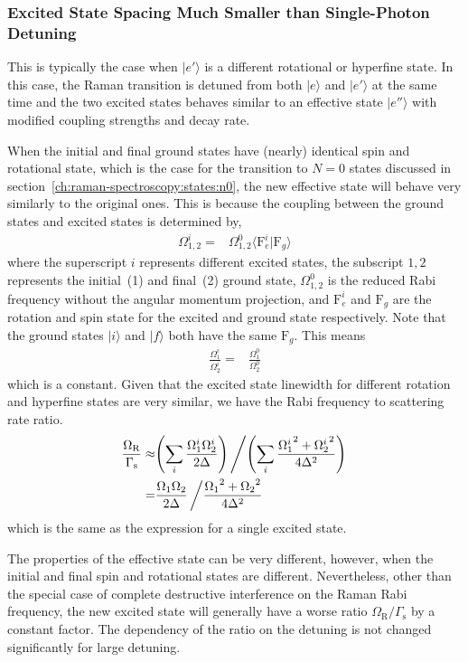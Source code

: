 \subsubsection{Excited State Spacing Much Smaller than Single-Photon Detuning}
\label{ch:raman-transfer:raman:extra-ext:tight-spacing}
This is typically the case when $|e'\rangle$ is a different rotational or hyperfine state.
In this case, the Raman transition is detuned from both $|e\rangle$ and $|e'\rangle$
at the same time and the two excited states behaves similar to an effective state $|e''\rangle$
with modified coupling strengths and decay rate.

When the initial and final ground states have (nearly) identical spin and rotational state,
which is the case for the transition to $N=0$ states
discussed in section~\ref{ch:raman-spectroscopy:states:n0},
the new effective state will behave very similarly to the original ones.
This is because the coupling between the ground states and excited states is determined by,
\begin{align*}
  \Omega_{1,2}^{i}=&\Omega_{1,2}^{0}\langle\mathrm{F}_e^i|\mathrm{F}_g\rangle
\end{align*}
where the superscript $i$ represents different excited states,
the subscript $1,2$ represents the initial~(1) and final~(2) ground state,
$\Omega_{1,2}^{0}$ is the reduced Rabi frequency without the angular momentum projection,
and $\mathrm{F}_e^i$ and $\mathrm{F}_g$ are the rotation and spin state for the excited
and ground state respectively. Note that the ground states $|i\rangle$ and $|f\rangle$
both have the same $\mathrm{F}_g$. This means
\begin{align*}
  \frac{\Omega_1^{i}}{\Omega_2^{i}}=&\frac{\Omega_1^{0}}{\Omega_2^{0}}
\end{align*}
which is a constant.
Given that the excited state linewidth for different rotation and hyperfine states
are very similar, we have the Rabi frequency to scattering rate ratio.
\begin{align*}
  \frac{\Omega_{\mathrm{R}}}{\Gamma_{\mathrm{s}}}\approx&{\left({\sum_i\frac{\Omega_1^i\Omega_2^i}{2\Delta}}\right)}\left/{\left({\sum_i\frac{{\Omega_1^i}^2+{\Omega_2^i}^2}{4\Delta^2}}\right)}\right.\\
  =&\frac{\Omega_1\Omega_2}{2\Delta}\left/\frac{{\Omega_1}^2+{\Omega_2}^2}{4\Delta^2}\right.
\end{align*}
which is the same as the expression for a single excited state.

The properties of the effective state can be very different, however,
when the initial and final spin and rotational states are different.
Nevertheless, other than the special case of complete destructive interference
on the Raman Rabi frequency,
the new excited state will generally have a worse ratio $\Omega_{\mathrm{R}}/\Gamma_{\mathrm{s}}$
by a constant factor.
The dependency of the ratio on the detuning is not changed significantly
for large detuning.

